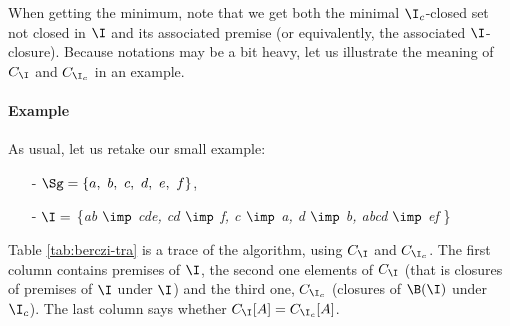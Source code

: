 When getting the minimum, note that we get both the minimal $\I_c$-closed set not closed in $\I$ and its associated premise (or equivalently, the associated $\I$-closure). Because notations may be a bit heavy, let us illustrate the meaning of $C_{\I}$ and $C_{\I_c}$ in an example.


\paragraph{Example} As usual, let us retake our small example:
\begin{itemize}
	\item[-] $\Sg = \{a, \ b, \ c, \ d, \ e, \ f \}$,
	\item[-] $\I =$ \{\textit{ab $\imp$ cde, cd $\imp$ f, c $\imp$ a, d $\imp$ b, abcd $\imp$ ef} \} 
\end{itemize}
\noindent Table \ref{tab:berczi-tra} is a trace of the algorithm, using $C_{\I}$ and $C_{\I_c}$. The first column contains premises of $\I$, the second one elements of $C_{\I}$ (that is closures of premises of $\I$ under $\I$) and
the third one, $C_{\I_c}$ (closures of $\B(\I)$ under $\I_c$). The last column
says whether $C_{\I}[A] = C_{\I_c}[A]$.

